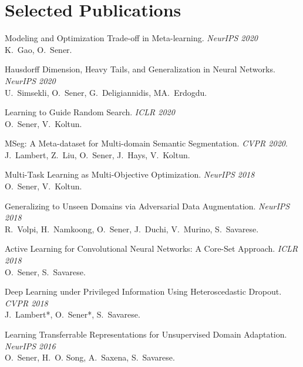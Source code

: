 
\section{\mysidestyle \textcolor{olgray}{Selected Publications}}
Modeling and Optimization Trade-off in Meta-learning.   \hfill {\em NeurIPS 2020} \\
\newblock K.~Gao, O.~Sener. 
\vspace{-2mm}

Hausdorff Dimension, Heavy Tails, and Generalization in Neural Networks. \hfill {\em NeurIPS 2020}\\
\newblock U.~Simsekli, O.~Sener, G.~Deligiannidis, MA.~Erdogdu.
\vspace{-2mm}

Learning to Guide Random Search. \hfill {\em ICLR 2020} \\
\newblock O.~Sener, V.~Koltun.
\vspace{-2mm}

MSeg: A Meta-dataset for Multi-domain Semantic Segmentation. \hfill {\em CVPR 2020}. \\
J.~Lambert, Z.~Liu, O.~Sener, J.~Hays, V.~Koltun.
\vspace{-2mm}

Multi-Task Learning as Multi-Objective Optimization. \hfill {\em NeurIPS 2018} \\
\newblock O.~Sener, V.~Koltun.
\vspace{-2mm}

Generalizing to Unseen Domains via Adversarial Data Augmentation.  \hfill {\em NeurIPS 2018} \\
\newblock R.~Volpi, H.~Namkoong, O.~Sener, J.~Duchi, V.~Murino, S.~Savarese.
\vspace{-2mm}

Active Learning for Convolutional Neural Networks: A Core-Set Approach. \hfill {\em ICLR 2018} \\
\newblock  O.~Sener, S.~Savarese.
\vspace{-2mm}

Deep Learning under Privileged Information Using Heteroscedastic Dropout. \hfill {\em CVPR 2018} \\
\newblock J.~Lambert*, O.~Sener*, S.~Savarese.
\vspace{-2mm}

Learning Transferrable Representations for Unsupervised Domain Adaptation. \hfill {\em NeurIPS 2016} \\
\newblock O.~Sener, H.~O. Song, A.~Saxena, S.~Savarese.
\vspace{-2mm}


